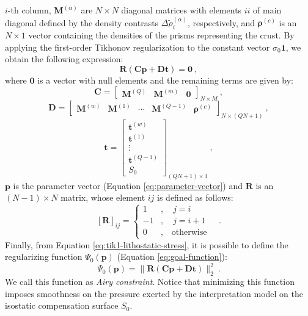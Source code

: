 \documentclass[manuscript]{geophysics}
\begin{document}
$i$-th column, $\mathbf{M}^{(\alpha)}$ are $N \times N$ diagonal matrices with elements
$ii$ of main diagonal defined by the density contrasts 
$\Delta \tilde{\rho}^{(\alpha)}_{i}$, respectively, and $\boldsymbol{\rho}^{(c)}$ is an 
$N \times 1$ vector containing the densities of the prisms
representing the crust. By applying the first-order Tikhonov regularization
\citep{aster-etal2005} to the constant vector $\sigma_{0} \mathbf{1}$, we obtain the
following expression:
\begin{equation}
\mathbf{R} \left( \mathbf{C} \mathbf{p} + \mathbf{D} \mathbf{t} \right) = \mathbf{0} 
\: ,
\label{eq:tik1-lithostatic-stress}
\end{equation}
where $\mathbf{0}$ is a vector with null elements and the remaining terms are given by:
\begin{equation}
\mathbf{C} = \begin{bmatrix}
\mathbf{M}^{(Q)} & \mathbf{M}^{(m)} & \mathbf{0}
\end{bmatrix}_{N \times M} \: ,
\label{eq:matrix-C}
\end{equation}
\begin{equation}
\mathbf{D} = \begin{bmatrix}
\mathbf{M}^{(w)} & \mathbf{M}^{(1)} & \cdots & \mathbf{M}^{(Q-1)} &
\boldsymbol{\rho}^{(c)}
\end{bmatrix}_{N \times \left( QN + 1 \right)} \: ,
\label{eq:matrix-D}
\end{equation}
\begin{equation}
\mathbf{t} = \begin{bmatrix}
\mathbf{t}^{(w)} \\ \mathbf{t}^{(1)} \\ \vdots \\ \mathbf{t}^{(Q-1)} \\ S_{0}
\end{bmatrix}_{\left( QN + 1 \right) \times 1}\: ,
\label{eq:vector-t}
\end{equation}
$\mathbf{p}$ is the parameter vector (Equation \ref{eq:parameter-vector}) and
$\mathbf{R}$ is an $\left( N-1 \right) \times N$ matrix, whose element $ij$ is defined
as follows:
\begin{equation}
\left[ \mathbf{R} \right]_{ij} = \begin{cases}
1 &, \quad j = i \\
-1 &, \quad j = i + 1 \\
0 &, \quad \text{otherwise}
\end{cases} \quad .
\label{eq:matrix-R}
\end{equation}
Finally, from Equation \ref{eq:tik1-lithostatic-stress}, it is possible to
define the regularizing function $\Psi_{0}(\mathbf{p})$ 
(Equation \ref{eq:goal-function}): 
\begin{equation}
\Psi_{0}(\mathbf{p}) = \| \mathbf{R} \left( \mathbf{C} \mathbf{p} + \mathbf{D}
\mathbf{t} \right) \|_{2}^{2} \: .
\label{eq:airy-constraint-function}
\end{equation}
We call this function as \textit{Airy constraint}. Notice that minimizing this
function imposes smoothness on the pressure exerted by the interpretation model on 
the isostatic compensation surface $S_{0}$.
\end{document}
